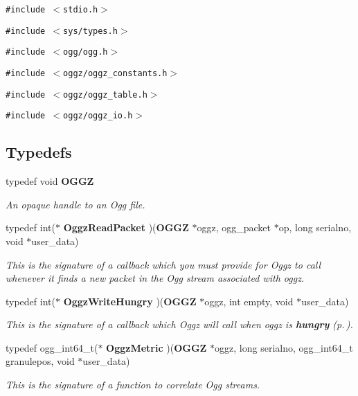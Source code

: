 {\tt \#include $<$stdio.h$>$}\par
{\tt \#include $<$sys/types.h$>$}\par
{\tt \#include $<$ogg/ogg.h$>$}\par
{\tt \#include $<$oggz/oggz\_\-constants.h$>$}\par
{\tt \#include $<$oggz/oggz\_\-table.h$>$}\par
{\tt \#include $<$oggz/oggz\_\-io.h$>$}\par
\subsection*{Typedefs}
\begin{CompactItemize}
\item 
typedef void {\bf OGGZ}
\begin{CompactList}\small\item\em An opaque handle to an Ogg file. \item\end{CompactList}\item 
typedef int($\ast$ {\bf Oggz\-Read\-Packet} )({\bf OGGZ} $\ast$oggz, ogg\_\-packet $\ast$op, long serialno, void $\ast$user\_\-data)
\begin{CompactList}\small\item\em This is the signature of a callback which you must provide for Oggz to call whenever it finds a new packet in the Ogg stream associated with {\em oggz\/}. \item\end{CompactList}\item 
typedef int($\ast$ {\bf Oggz\-Write\-Hungry} )({\bf OGGZ} $\ast$oggz, int empty, void $\ast$user\_\-data)
\begin{CompactList}\small\item\em This is the signature of a callback which Oggz will call when {\em oggz\/} is {\bf hungry }{\rm (p.\,\pageref{group__hungry})}. \item\end{CompactList}\item 
typedef ogg\_\-int64\_\-t($\ast$ {\bf Oggz\-Metric} )({\bf OGGZ} $\ast$oggz, long serialno, ogg\_\-int64\_\-t granulepos, void $\ast$user\_\-data)
\begin{CompactList}\small\item\em This is the signature of a function to correlate Ogg streams. \item\end{CompactList}\end{CompactItemize}
